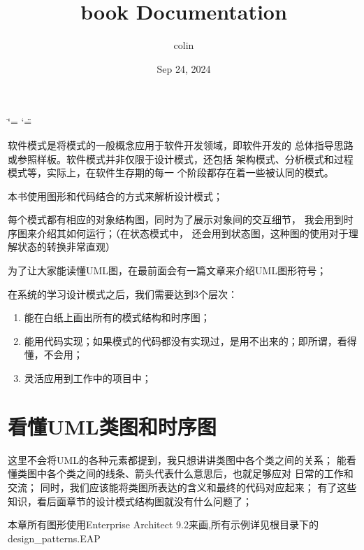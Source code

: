 \documentclass[letterpaper,10pt,english]{sphinxmanual}
\title{book Documentation}
\date{Sep 24, 2024}
\author{colin}
\begin{document}
\ifdefined\shorthandoff
  \ifnum\catcode`\=\string=\active\shorthandoff{=}\fi
  \ifnum\catcode`\"=\active{}\fi
\fi

\pagestyle{empty}
\sphinxmaketitle
\pagestyle{plain}
\sphinxtableofcontents
\pagestyle{normal}
\label{\detokenize{index::doc}}


\sphinxAtStartPar
软件模式是将模式的一般概念应用于软件开发领域，即软件开发的
总体指导思路或参照样板。软件模式并非仅限于设计模式，还包括
架构模式、分析模式和过程模式等，实际上，在软件生存期的每一
个阶段都存在着一些被认同的模式。

\sphinxAtStartPar
本书使用图形和代码结合的方式来解析设计模式；

\sphinxAtStartPar
每个模式都有相应的对象结构图，同时为了展示对象间的交互细节， 我会用到时序图来介绍其如何运行；（在状态模式中， 还会用到状态图，这种图的使用对于理解状态的转换非常直观）

\sphinxAtStartPar
为了让大家能读懂UML图，在最前面会有一篇文章来介绍UML图形符号；

\sphinxAtStartPar
在系统的学习设计模式之后，我们需要达到3个层次：
\begin{enumerate}
%
\item {} 
\sphinxAtStartPar
能在白纸上画出所有的模式结构和时序图；

\item {} 
\sphinxAtStartPar
能用代码实现；如果模式的代码都没有实现过，是用不出来的；即所谓，看得懂，不会用；

\item {} 
\sphinxAtStartPar
灵活应用到工作中的项目中；

\end{enumerate}

\sphinxstepscope


\chapter{看懂UML类图和时序图}
\label{\detokenize{read_uml:uml}}\label{\detokenize{read_uml:read-uml}}\label{\detokenize{read_uml::doc}}
\sphinxAtStartPar
这里不会将UML的各种元素都提到，我只想讲讲类图中各个类之间的关系；
能看懂类图中各个类之间的线条、箭头代表什么意思后，也就足够应对
日常的工作和交流；
同时，我们应该能将类图所表达的含义和最终的代码对应起来；
有了这些知识，看后面章节的设计模式结构图就没有什么问题了；

\sphinxAtStartPar
本章所有图形使用Enterprise Architect 9.2来画,所有示例详见根目录下的design\_patterns.EAP
\end{document}

